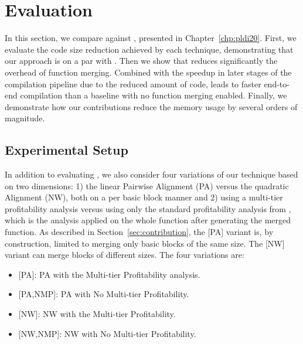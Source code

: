 \section{Evaluation}
\label{sec:evaluation}

In this section, we compare {\ProjName} against {\SOAName}, presented in Chapter~\ref{chp:pldi20}.
First, we evaluate the code size reduction achieved by each technique, demonstrating that our approach is on a par with {\SOAName}. Then we show that {\ProjName} reduces significantly the overhead of function merging. %
Combined with the speedup in later stages of the compilation pipeline due to the reduced amount of code, {\ProjName} leads to faster end-to-end compilation than a baseline with no function merging enabled. Finally, we demonstrate how our contributions reduce the memory usage by several orders of magnitude. 

\subsection{Experimental Setup}
In addition to evaluating \SOAName, we also consider four variations of our technique based on two dimensions:
1) the linear Pairwise Alignment (PA) versus the quadratic {\NW} Alignment (NW), both on a per basic block manner and
2) using a multi-tier profitability analysis versus using only the standard profitability analysis from {\SOAName}, which is the analysis applied on the whole function after generating the merged function.
As described in Section~\ref{sec:contribution}, the [PA] variant is, by construction, limited to merging only basic blocks of the same size. The [NW] variant can merge blocks of different sizes. The four variations are:

\begin{itemize}
    \item {[PA]}: PA with the Multi-tier Profitability analysis.
    \item {[PA,NMP]}: PA with No Multi-tier Profitability.
    \item {[NW]}: NW with the Multi-tier Profitability.
    \item {[NW,NMP]}: NW with No Multi-tier Profitability.
\end{itemize}

